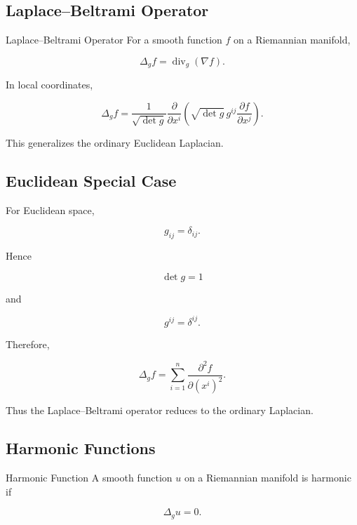 \subsection{Laplace--Beltrami Operator}
\label{subsec:laplace-beltrami}

\begin{definitionbox}{Laplace--Beltrami Operator}
For a smooth function \(f\) on a Riemannian manifold,

\[
\boxed{
\Delta_g f
=
\operatorname{div}_g(\nabla f).
}
\]
\end{definitionbox}

In local coordinates,

\[
\boxed{
\Delta_g f
=
\frac{1}{\sqrt{\det g}}
\frac{\partial}{\partial x^i}
\left(
\sqrt{\det g}\,
g^{ij}
\frac{\partial f}{\partial x^j}
\right).
}
\]

This generalizes the ordinary Euclidean Laplacian.

\subsection{Euclidean Special Case}
\label{subsec:laplace-beltrami-euclidean}

For Euclidean space,

\[
g_{ij}
=
\delta_{ij}.
\]

Hence

\[
\det g=1
\]

and

\[
g^{ij}=\delta^{ij}.
\]

Therefore,

\[
\boxed{
\Delta_g f
=
\sum_{i=1}^{n}
\frac{\partial^2f}{\partial(x^i)^2}.
}
\]

Thus the Laplace--Beltrami operator reduces to the ordinary Laplacian.

\subsection{Harmonic Functions}
\label{subsec:geometric-harmonic-functions}

\begin{definitionbox}{Harmonic Function}
A smooth function \(u\) on a Riemannian manifold is harmonic if

\[
\boxed{
\Delta_g u=0.
}
\]
\end{definitionbox}

